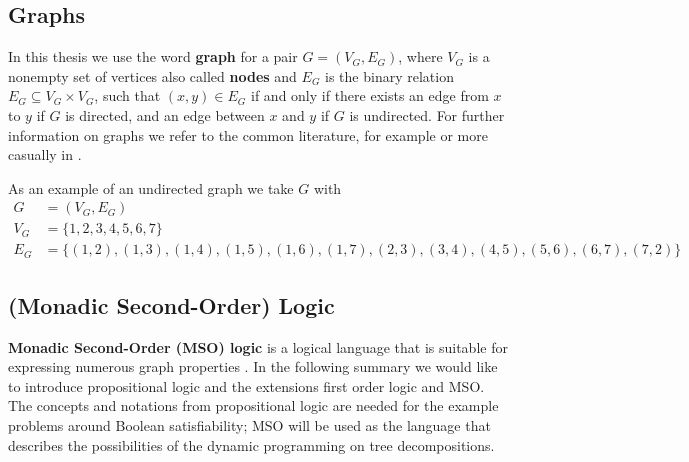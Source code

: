 \documentclass[a4paper, 12pt, bibliography=totoc]{scrartcl}
\begin{document}
\subsection{Graphs}

In this thesis we use the word \textbf{graph} for a pair $G=(V_{G},E_{G})$, where $V_{G}$ is a nonempty set of vertices also called \textbf{nodes} and $E_{G}$ is the binary relation $E_{G} \subseteq V_{G} \times V_{G}$, such that $(x,y)\in E_{G}$ if and only if there exists an edge from $x$ to $y$ if $G$ is directed, and an edge between $x$ and $y$ if $G$ is undirected. For further information on graphs we refer to the common literature, for example \cite[p. {401--412}]{HandbookMathGraph} or more casually in \cite{britannicagraphs}. 

\begin{example}\label{ex:wheelgraph}
	As an example of an undirected graph we take $G$ with
	\begin{align*}
	 G&=(V_{G},E_{G})\\
	 	 V_{G} &= \{1,2,3,4,5,6,7\}\\
	   E_{G} &= \{(1,2),(1,3), (1,4), (1,5),(1,6), (1,7), (2,3), (3,4), (4,5), (5,6), (6,7), (7,2)\}
	\end{align*}
\end{example}

\subsection{(Monadic Second-Order) Logic}\label{sec:MSO}

\textbf{Monadic Second-Order (MSO) logic} is a logical language that is suitable for expressing numerous graph properties \cite[p.~41]{Courcelle2012}. In the following summary we would like to introduce propositional logic and the extensions first order logic and MSO. The concepts and notations from propositional logic are needed for the example problems around Boolean satisfiability; MSO will be used as the language that describes the possibilities of the dynamic programming on tree decompositions.
\end{document}
